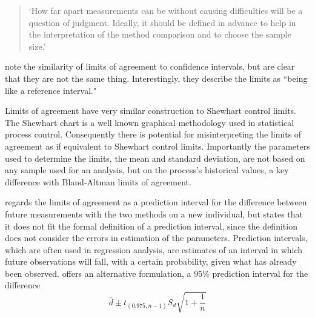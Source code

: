 \documentclass[12pt, a4paper]{article}
\begin{document}
\begin{quote}
`How far apart measurements can be without causing difficulties
will be a question of judgment. Ideally, it should be defined in
advance to help in the interpretation of the method comparison and
to choose the sample size.'\citep{BA86}
\end{quote}

\citet{BA99} note the similarity of limits of agreement to
confidence intervals, but are clear that they are not the same
thing. Interestingly, they describe the limits as ``being like a
reference interval."

Limits of agreement have very similar construction to Shewhart
control limits. The Shewhart chart is a well known graphical
methodology used in statistical process control. Consequently
there is potential for misinterpreting the limits of agreement as
if equivalent to Shewhart control limits. Importantly the
parameters used to determine the limits, the mean and standard
deviation, are not based on any sample used for an analysis, but
on the process's historical values, a key difference with
Bland-Altman limits of agreement.

\citet{BXC2008} regards the limits of agreement as a prediction
interval for the difference between future measurements with the
two methods on a new individual, but states that it does not fit
the formal definition of a prediction interval, since the
definition does not consider the errors in estimation of the
parameters. Prediction intervals, which are often used in
regression analysis, are estimates of an interval in which future
observations will fall, with a certain probability, given what has
already been observed. \citet{BXC2008} offers an alternative
formulation, a $95\%$ prediction interval for the difference
\begin{equation}
\bar{d} \pm t_{(0.975, n-1)}S_{d} \sqrt{1+\frac{1}{n}}
\end{equation}
\end{document}
